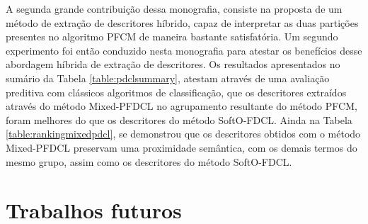 A segunda grande contribuição dessa monografia, consiste na proposta de um método de extração de
descritores híbrido, capaz de interpretar as duas partições presentes no algoritmo PFCM de maneira
bastante satisfatória. Um segundo experimento foi então conduzido nesta monografia para atestar os
benefícios desse abordagem híbrida de extração de descritores. Os resultados apresentados no sumário
da Tabela \ref{table:pdclsummary}, atestam através de uma avaliação preditiva com clássicos
algoritmos de classificação, que os descritores extraídos através do método Mixed-PFDCL no
agrupamento resultante do método PFCM, foram melhores do que os descritores do método SoftO-FDCL.
Ainda na Tabela \ref{table:rankingmixedpdcl}, se demonstrou que os descritores obtidos com o método
Mixed-PFDCL preservam uma proximidade semântica, com os demais termos do mesmo grupo, assim como os
descritores do método SoftO-FDCL.





\section{Trabalhos futuros}

